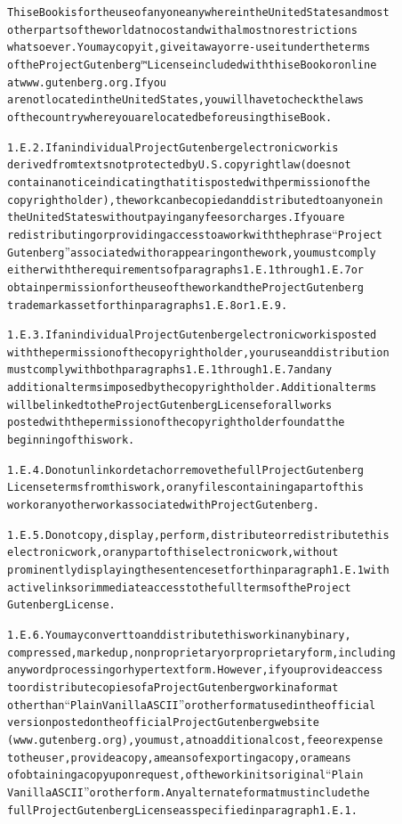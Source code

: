 \documentclass[12pt]{book}[2005/09/16]
\newenvironment{PGtext}{%
\begin{alltt}
\fontsize{9.2}{10.5}\ttfamily\selectfont}%
{\end{alltt}}
\begin{document}
\begin{PGtext}
    This eBook is for the use of anyone anywhere in the United States and most
    other parts of the world at no cost and with almost no restrictions
    whatsoever. You may copy it, give it away or re-use it under the terms
    of the Project Gutenberg™ License included with this eBook or online
    at www.gutenberg.org. If you
    are not located in the United States, you will have to check the laws
    of the country where you are located before using this eBook.
  
1.E.2. If an individual Project Gutenberg electronic work is
derived from texts not protected by U.S. copyright law (does not
contain a notice indicating that it is posted with permission of the
copyright holder), the work can be copied and distributed to anyone in
the United States without paying any fees or charges. If you are
redistributing or providing access to a work with the phrase “Project
Gutenberg” associated with or appearing on the work, you must comply
either with the requirements of paragraphs 1.E.1 through 1.E.7 or
obtain permission for the use of the work and the Project Gutenberg
trademark as set forth in paragraphs 1.E.8 or 1.E.9.

1.E.3. If an individual Project Gutenberg electronic work is posted
with the permission of the copyright holder, your use and distribution
must comply with both paragraphs 1.E.1 through 1.E.7 and any
additional terms imposed by the copyright holder. Additional terms
will be linked to the Project Gutenberg License for all works
posted with the permission of the copyright holder found at the
beginning of this work.

1.E.4. Do not unlink or detach or remove the full Project Gutenberg
License terms from this work, or any files containing a part of this
work or any other work associated with Project Gutenberg.

1.E.5. Do not copy, display, perform, distribute or redistribute this
electronic work, or any part of this electronic work, without
prominently displaying the sentence set forth in paragraph 1.E.1 with
active links or immediate access to the full terms of the Project
Gutenberg License.

1.E.6. You may convert to and distribute this work in any binary,
compressed, marked up, nonproprietary or proprietary form, including
any word processing or hypertext form. However, if you provide access
to or distribute copies of a Project Gutenberg work in a format
other than “Plain Vanilla ASCII” or other format used in the official
version posted on the official Project Gutenberg website
(www.gutenberg.org), you must, at no additional cost, fee or expense
to the user, provide a copy, a means of exporting a copy, or a means
of obtaining a copy upon request, of the work in its original “Plain
Vanilla ASCII” or other form. Any alternate format must include the
full Project Gutenberg License as specified in paragraph 1.E.1.


\end{PGtext}
\end{document}
